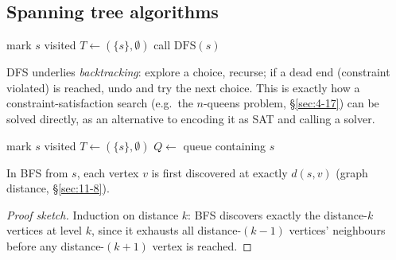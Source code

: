 \documentclass[11pt]{article}
\begin{document}
\subsection{Spanning tree algorithms}
\label{sec:12-4-2}

\begin{algorithm}[H]
\SetAlgoLined
{}
mark $s$ visited\; $T\gets(\{s\},\emptyset)$\;
call $\mathrm{DFS}(s)$\;
\caption{Depth-first search}
\end{algorithm}

\begin{note}
DFS underlies \emph{backtracking}: explore a choice, recurse; if a dead end (constraint violated) is reached, undo and try the next choice. This is exactly how a constraint-satisfaction search (e.g.\ the $n$-queens problem, \S\ref{sec:4-17}) can be solved directly, as an alternative to encoding it as SAT and calling a solver.
\end{note}

\bigskip
\begin{algorithm}[H]
\SetAlgoLined
{}
mark $s$ visited\; $T\gets(\{s\},\emptyset)$\; $Q\gets$ queue containing $s$\;
\caption{Breadth-first search}
\end{algorithm}

\begin{theorem}
In BFS from $s$, each vertex $v$ is first discovered at exactly $d(s,v)$ (graph distance, \S\ref{sec:11-8}).
\end{theorem}
\begin{proof}[Proof sketch]
Induction on distance $k$: BFS discovers exactly the distance-$k$ vertices at level $k$, since it exhausts all distance-$(k{-}1)$ vertices' neighbours before any distance-$(k{+}1)$ vertex is reached.
\end{proof}
\end{document}
